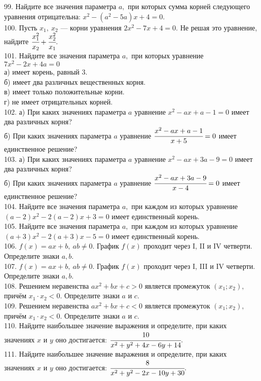 99. Найдите все значения параметра $a,$ при которых сумма корней следующего уравнения отрицательна: $x^2-(a^2-5a)x+4=0.$\\
100. Пусть $x_1,\ x_2$ --- корни уравнения $2x^2-7x+4=0.$ Не решая это уравнение, найдите $\cfrac{x_1^2}{x_2}+\cfrac{x_2^2}{x_1}.$\\
101. Найдите все значения параметра $a,$ при которых уравнение $7x^2-2x+4a=0$\\
а) имеет корень, равный 3.\\
б) имеет два различных вещественных корня.\\
в) имеет только положительные корни.\\
г) не имеет отрицательных корней.\\
102. а) При каких значениях параметра $a$ уравнение $x^2-ax+a-1=0$ имеет два различных корня?\\
б) При каких значениях параметра $a$ уравнение $\cfrac{x^2-ax+a-1}{x+5}=0$ имеет единственное решение?\\
103. а) При каких значениях параметра $a$ уравнение $x^2-ax+3a-9=0$ имеет два различных корня?\\
б) При каких значениях параметра $a$ уравнение $\cfrac{x^2-ax+3a-9}{x-4}=0$ имеет единственное решение?\\
104. Найдите все значения параметра $a,$ при каждом из которых уравнение
$(a - 2)x^2 - 2(a - 2)x + 3 = 0$ имеет единственный корень.\\
105. Найдите все значения параметра $a,$ при каждом из которых уравнение
$(a + 3)x^2 - 2(a + 3)x - 5 = 0$ имеет единственный корень.\\
106. $f(x)=ax+b,\ ab\neq 0.$ График $f(x)$ проходит через I, II и IV четверти. Определите знаки $a,b.$\\
107. $f(x)=ax+b,\ ab\neq 0.$ График $f(x)$ проходит через I, III и IV четверти. Определите знаки $a,b.$\\
108. Решением неравенства $ax^2 + bx + c > 0$ является промежуток $(x_1; x_2),$ причём $x_1\cdot x_2 <  0.$ Определите знаки $a$ и $c.$\\
109. Решением неравенства $ax^2 + bx + c < 0$ является промежуток $(x_1; x_2),$ причём $x_1\cdot x_2 <  0.$ Определите знаки $a$ и $c.$\\
110. Найдите наибольшее значение выражения и определите, при каких значениях $x$ и $y$ оно достигается: $\cfrac{10}{x^2+y^2+4x-6y+14}.$\\
111. Найдите наибольшее значение выражения и определите, при каких значениях $x$ и $y$ оно достигается: $\cfrac{8}{x^2+y^2-2x-10y+30}.$\\
